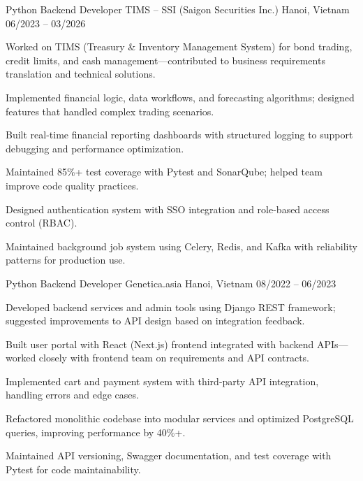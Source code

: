 

\begin{cventries}


\cventry
  {Python Backend Developer} %
  {TIMS – SSI (Saigon Securities Inc.)} %
  {Hanoi, Vietnam} %
  {06/2023 -- 03/2026} %
  {
    \begin{cvitems}
      \item {Worked on TIMS (Treasury \& Inventory Management System) for bond trading, credit limits, and cash management—contributed to business requirements translation and technical solutions.}
      \item {Implemented financial logic, data workflows, and forecasting algorithms; designed features that handled complex trading scenarios.}
      \item {Built real-time financial reporting dashboards with structured logging to support debugging and performance optimization.}
      \item {Maintained 85\%+ test coverage with Pytest and SonarQube; helped team improve code quality practices.}
      \item {Designed authentication system with SSO integration and role-based access control (RBAC).}
      \item {Maintained background job system using Celery, Redis, and Kafka with reliability patterns for production use.}
    \end{cvitems}
  }

\cventry
  {Python Backend Developer} %
  {Genetica.asia} %
  {Hanoi, Vietnam} %
  {08/2022 -- 06/2023} %
  {
    \begin{cvitems}
      \item {Developed backend services and admin tools using Django REST framework; suggested improvements to API design based on integration feedback.}
      \item {Built user portal with React (Next.js) frontend integrated with backend APIs—worked closely with frontend team on requirements and API contracts.}
      \item {Implemented cart and payment system with third-party API integration, handling errors and edge cases.}
      \item {Refactored monolithic codebase into modular services and optimized PostgreSQL queries, improving performance by 40\%+.}
      \item {Maintained API versioning, Swagger documentation, and test coverage with Pytest for code maintainability.}
    \end{cvitems}
  }


\end{cventries}
